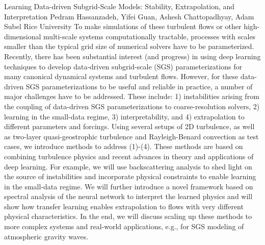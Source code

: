 \vspace{1.5ex}
\abs
{Learning Data-driven Subgrid-Scale Models: Stability, Extrapolation, and Interpretation}
{Pedram Hassanzadeh, Yifei Guan, Ashesh Chattopadhyay, Adam Subel}
{Rice University}
{To make simulations of these turbulent flows or other high-dimensional multi-scale systems computationally tractable, processes with scales smaller than the typical grid size of numerical solvers have to be parameterized. Recently, there has been substantial interest (and progress) in using deep learning techniques to develop data-driven subgrid-scale (SGS) parameterizations for many canonical dynamical systems and turbulent flows. However, for these data-driven SGS parameterizations to be useful and reliable in practice, a number of major challenges have to be addressed. These include: 1) instabilities arising from the coupling of data-driven SGS parameterizations to coarse-resolution solvers, 2) learning in the small-data regime, 3) interpretability, and 4) extrapolation to different parameters and forcings. Using several setups of 2D turbulence, as well as two-layer quasi-geostrophic turbulence and Rayleigh-Benard convection as test cases, we introduce methods to address (1)-(4). These methods are based on combining turbulence physics and recent advances in theory and applications of deep learning. For example, we will use backscattering analysis to shed light on the source of instabilities and incorporate physical constraints to enable learning in the small-data regime. We will further introduce a novel framework based on spectral analysis of the neural network to interpret the learned physics and will show how transfer learning enables extrapolation to flows with very different physical characteristics. In the end, we will discuss scaling up these methods to more complex systems and real-world applications, e.g., for SGS modeling of atmospheric gravity waves.}


